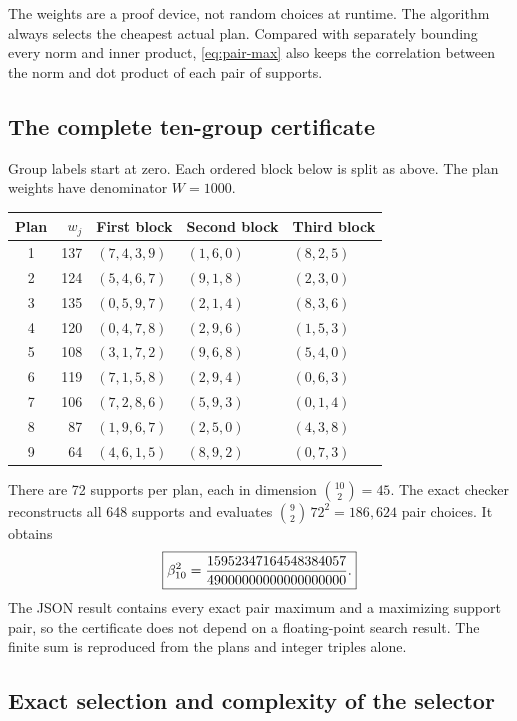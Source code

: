 The weights are a proof device, not random choices at runtime. The
algorithm always selects the cheapest actual plan. Compared with separately
bounding every norm and inner product, \eqref{eq:pair-max} also keeps the
correlation between the norm and dot product of each pair of supports.

\subsection{The complete ten-group certificate}

Group labels start at zero. Each ordered block below is split as above.
The plan weights have denominator $W=1000$.

\begin{center}\small
\begin{tabular}{crlll}
\toprule Plan & $w_j$ & First block & Second block & Third block\\\midrule
1&137&$(7,4,3,9)$&$(1,6,0)$&$(8,2,5)$\\
2&124&$(5,4,6,7)$&$(9,1,8)$&$(2,3,0)$\\
3&135&$(0,5,9,7)$&$(2,1,4)$&$(8,3,6)$\\
4&120&$(0,4,7,8)$&$(2,9,6)$&$(1,5,3)$\\
5&108&$(3,1,7,2)$&$(9,6,8)$&$(5,4,0)$\\
6&119&$(7,1,5,8)$&$(2,9,4)$&$(0,6,3)$\\
7&106&$(7,2,8,6)$&$(5,9,3)$&$(0,1,4)$\\
8&87&$(1,9,6,7)$&$(2,5,0)$&$(4,3,8)$\\
9&64&$(4,6,1,5)$&$(8,9,2)$&$(0,7,3)$\\
\bottomrule
\end{tabular}\end{center}

There are 72 supports per plan, each in dimension $\binom{10}2=45$.
The exact checker reconstructs all 648 supports and evaluates
$\binom92\,72^2=186{,}624$ pair choices. It obtains
\begin{equation}\label{eq:beta10}
 \boxed{\displaystyle\beta_{10}^2=\frac{15952347164548384057}{49000000000000000000}.}
\end{equation}
The JSON result contains every exact pair maximum and a maximizing support
pair, so the certificate does not depend on a floating-point search result.
The finite sum is reproduced from the plans and integer triples alone.

\subsection{Exact selection and complexity of the selector}

